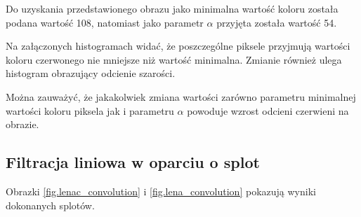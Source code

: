 \documentclass{classrep}
\begin{document}
Do uzyskania przedstawionego obrazu jako minimalna wartość koloru została podana wartość 108, natomiast jako parametr $\alpha$ przyjęta została wartość 54.

Na załączonych histogramach widać, że poszczególne piksele przyjmują wartości koloru czerwonego nie mniejsze niż wartość minimalna. Zmianie również ulega histogram obrazujący odcienie szarości.

Można zauważyć, że jakakolwiek zmiana wartości zarówno parametru minimalnej wartości koloru piksela jak i parametru $\alpha$ powoduje wzrost odcieni czerwieni na obrazie.

\subsection{Filtracja liniowa w oparciu o splot}
Obrazki \ref{fig.lenac_convolution} i \ref{fig.lena_convolution} pokazują wyniki dokonanych splotów.
\end{document}
